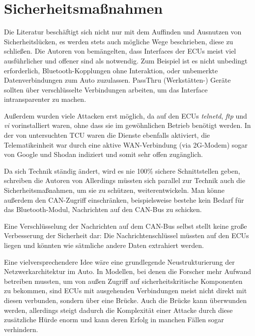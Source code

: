 \documentclass[
    fontsize=12pt,
    headings=small,
    parskip=half,           %
    bibliography=totoc,
    numbers=noenddot,       %
    open=any,               %
    ]{scrreprt}
\begin{document}
\section{Sicherheitsmaßnahmen}
Die Literatur beschäftigt sich nicht nur mit dem Auffinden und Ausnutzen von Sicherheitslücken, es werden stets auch mögliche Wege beschrieben, diese zu schließen.
Die Autoren von \cite{CMK11} bemängelten, dass Interfaces der ECUs meist viel ausführlicher und offener sind als notwendig. Zum Beispiel ist es nicht unbedingt erforderlich, Bluetooth-Kopplungen ohne Interaktion, oder unbemerkte Datenverbindungen zum Auto zuzulassen. PassThru (Werkstätten-) Geräte sollten über verschlüsselte Verbindungen arbeiten, um das Interface intransparenter zu machen.\par
Außerdem wurden viele Attacken erst möglich, da auf den ECUs \textit{telnetd}, \textit{ftp} und \textit{vi} vorinstalliert waren, ohne dass sie im gewöhnlichen Betrieb benötigt werden. In der von \cite{FPK15} untersuchten TCU waren die Dienste ebenfalls aktiviert, die Telematikeinheit war durch eine aktive WAN-Verbindung (via 2G-Modem) sogar von Google und Shodan indiziert und somit sehr offen zugänglich.\par
Da sich Technik ständig ändert, wird es nie 100\% sichere Schnittstellen geben, schreiben die Autoren von \cite{MiV14} Allerdings müssten sich parallel zur Technik auch die Sicherheitsmaßnahmen, um sie zu schützen, weiterentwickeln. Man könne außerdem den CAN-Zugriff einschränken, beispielsweise bestehe kein Bedarf für das Bluetooth-Modul, Nachrichten auf den CAN-Bus zu schicken.\par
Eine Verschlüsselung der Nachrichten auf dem CAN-Bus selbst stellt keine große Verbesserung der Sicherheit dar: Die Nachrichtenschlüssel müssten auf den ECUs liegen und könnten wie sätmliche andere Daten extrahiert werden.\par
Eine vielversprechendere Idee wäre eine grundlegende Neustrukturierung der Netzwerkarchitektur im Auto. In Modellen, bei denen die Forscher mehr Aufwand betreiben mussten, um von außen Zugriff auf sicherheitskritische Komponenten zu bekommen, sind ECUs mit ausgehenden Verbindungen meist nicht direkt mit diesen verbunden, sondern über eine Brücke. Auch die Brücke kann überwunden werden, allerdings steigt dadurch die Komplexität einer Attacke durch diese zusätzliche Hürde enorm und kann deren Erfolg in manchen Fällen sogar verhindern. \par
\end{document}
